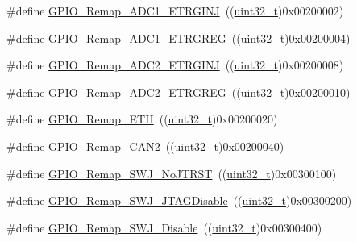 \begin{DoxyCompactItemize}
\item 
\#define \hyperlink{group___g_p_i_o___remap__define_gaf79d966f49b64d3feb0ba9cc39294dac}{G\+P\+I\+O\+\_\+\+Remap\+\_\+\+A\+D\+C1\+\_\+\+E\+T\+R\+G\+I\+NJ}~((\hyperlink{_p_e___types_8h_a33594304e786b158f3fb30289278f5af}{uint32\+\_\+t})0x00200002)
\item 
\#define \hyperlink{group___g_p_i_o___remap__define_gab1d040cab5d9f16f362edc2e8b47a82a}{G\+P\+I\+O\+\_\+\+Remap\+\_\+\+A\+D\+C1\+\_\+\+E\+T\+R\+G\+R\+EG}~((\hyperlink{_p_e___types_8h_a33594304e786b158f3fb30289278f5af}{uint32\+\_\+t})0x00200004)
\item 
\#define \hyperlink{group___g_p_i_o___remap__define_gae00aaabeed54e805932ec6978acf000d}{G\+P\+I\+O\+\_\+\+Remap\+\_\+\+A\+D\+C2\+\_\+\+E\+T\+R\+G\+I\+NJ}~((\hyperlink{_p_e___types_8h_a33594304e786b158f3fb30289278f5af}{uint32\+\_\+t})0x00200008)
\item 
\#define \hyperlink{group___g_p_i_o___remap__define_gaa782a0c482f34507c82e4cd639bb747e}{G\+P\+I\+O\+\_\+\+Remap\+\_\+\+A\+D\+C2\+\_\+\+E\+T\+R\+G\+R\+EG}~((\hyperlink{_p_e___types_8h_a33594304e786b158f3fb30289278f5af}{uint32\+\_\+t})0x00200010)
\item 
\#define \hyperlink{group___g_p_i_o___remap__define_gaf578688bb4d1a17fb3a103946e7c2eb7}{G\+P\+I\+O\+\_\+\+Remap\+\_\+\+E\+TH}~((\hyperlink{_p_e___types_8h_a33594304e786b158f3fb30289278f5af}{uint32\+\_\+t})0x00200020)
\item 
\#define \hyperlink{group___g_p_i_o___remap__define_ga14c09a5050063b703fa07181afc56ee6}{G\+P\+I\+O\+\_\+\+Remap\+\_\+\+C\+A\+N2}~((\hyperlink{_p_e___types_8h_a33594304e786b158f3fb30289278f5af}{uint32\+\_\+t})0x00200040)
\item 
\#define \hyperlink{group___g_p_i_o___remap__define_ga81009ef35f7f039365291cf4f6fc0c5b}{G\+P\+I\+O\+\_\+\+Remap\+\_\+\+S\+W\+J\+\_\+\+No\+J\+T\+R\+ST}~((\hyperlink{_p_e___types_8h_a33594304e786b158f3fb30289278f5af}{uint32\+\_\+t})0x00300100)
\item 
\#define \hyperlink{group___g_p_i_o___remap__define_ga25fb8c789334694861444e48f486879d}{G\+P\+I\+O\+\_\+\+Remap\+\_\+\+S\+W\+J\+\_\+\+J\+T\+A\+G\+Disable}~((\hyperlink{_p_e___types_8h_a33594304e786b158f3fb30289278f5af}{uint32\+\_\+t})0x00300200)
\item 
\#define \hyperlink{group___g_p_i_o___remap__define_gaf4832412d0ba344bb9147142cfcda828}{G\+P\+I\+O\+\_\+\+Remap\+\_\+\+S\+W\+J\+\_\+\+Disable}~((\hyperlink{_p_e___types_8h_a33594304e786b158f3fb30289278f5af}{uint32\+\_\+t})0x00300400)
\item 

\end{DoxyCompactItemize}
